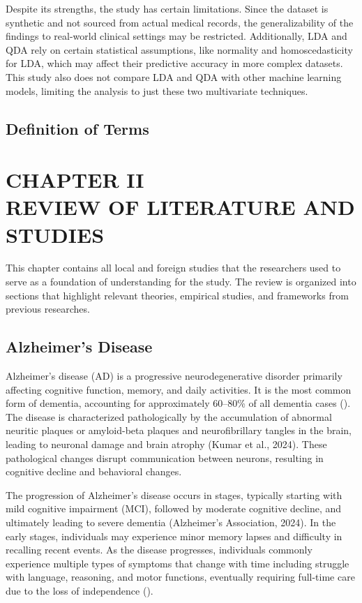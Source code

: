 \documentclass[12pt]{article}
\begin{document}
Despite its strengths, the study has certain limitations. Since the dataset is synthetic and not sourced from actual medical records, the generalizability of the findings to real-world clinical settings may be restricted. Additionally, LDA and QDA rely on certain
statistical assumptions, like normality and homoscedasticity for LDA, which may affect their predictive accuracy in more complex datasets. This study also does not compare LDA and QDA with other machine learning models, limiting the analysis to just these two multivariate
techniques. 

\subsection{Definition of Terms}

\newpage
\section{CHAPTER II \\ REVIEW OF LITERATURE AND STUDIES}

This chapter contains all local and foreign studies that the 
researchers used to serve as a foundation of understanding
for the study. The review is organized into sections 
that highlight relevant theories, empirical studies, and 
frameworks from previous researches. 

\subsection{Alzheimer's Disease}
\noindent

Alzheimer’s disease (AD) is a progressive neurodegenerative disorder primarily affecting cognitive function, memory, and daily activities. It is the most common form of dementia, accounting for approximately 60–80\% of all dementia cases (\cite{alzheimers2024}). 
The disease is characterized pathologically by the accumulation of abnormal neuritic plaques or amyloid-beta plaques and neurofibrillary tangles in the brain, leading to neuronal damage and brain atrophy (Kumar et al., 2024). These pathological changes disrupt communication between neurons, 
resulting in cognitive decline and behavioral changes. 

The progression of Alzheimer’s disease occurs in stages, typically starting with mild cognitive impairment (MCI), followed by moderate cognitive decline, and ultimately leading to severe dementia (Alzheimer’s Association, 2024). In the early stages, individuals may experience minor memory lapses 
and difficulty in recalling recent events. As the disease progresses, individuals commonly experience multiple types of symptoms that change with time including struggle with language, reasoning, and motor functions, eventually requiring full-time care due to the loss of independence (\cite{Dubois2016}).
\end{document}
